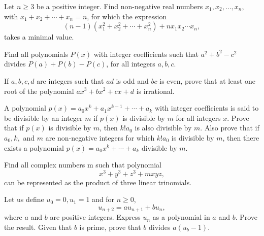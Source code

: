 \documentclass[12pt,a4paper]{memoir}
\theoremstyle{definition}
\begin{document}
\begin{question}[name={2010 Donova (Danube)}]
	Let $n\ge3$ be a positive integer. Find non-negative real numbers $x_1,x_2,\dots,x_n$, with $x_1+x_2+\cdots +x_n=n$, for which the expression \[(n-1)(x_1^2+x_2^2+\cdots+x_n^2)+nx_1x_2\cdots x_n,\] takes a minimal value.
\end{question}


\begin{question}[name={2017 Donova (Danube)}]
	Find all polynomials $P(x)$ with integer coefficients such that $a^2+b^2-c^2$ divides $P(a)+P(b)-P(c)$, for all integers $a,b,c$.
\end{question}

\begin{question}[name={1959--1966 IMO Longlist}]
	If $a,b, c,d$ are integers such that $ad$ is odd and $bc$ is even, prove that at least one root of the polynomial $ax^3 +bx^2 +cx+d$ is irrational.
\end{question}

\begin{question}[name={1968 IMO Shortlist}]
	A polynomial $p(x) = a_0x^k +a_1x^{k-1} +\cdots+a_k$ with integer coefficients is said to be divisible by an integer $m$ if $p(x)$ is divisible by $m$ for all integers $x$. Prove that if $p(x)$ is divisible by $m$, then $k!a_0$ is also divisible by $m$. Also prove that if $a_0, k,$ and $m$ are non-negative integers for which $k!a_0$ is divisible by $m$, then there exists a polynomial $p(x) = a_0x^k +\cdots+a_k$ divisible by $m$.
\end{question}


\begin{question}[name={1968 IMO Shortlist}]
	Find all complex numbers m such that polynomial
	\[x^3 +y^3 +z^3 +mxyz,\]
	can be represented as the product of three linear trinomials.
\end{question}


\begin{question}[name={1969 IMO Longlist}]
	Let us define $u_0 = 0, u_1 = 1$ and for $n \geq 0$, \[u_{n+2} = au_{n+1} +bu_n ,\] where $a$ and $b$ are positive integers. Express $u_n$ as a polynomial in $a$ and $b$. Prove the result. Given that $b$ is prime, prove that $b$ divides $a(u_b -1)$.
\end{question}
\end{document}

